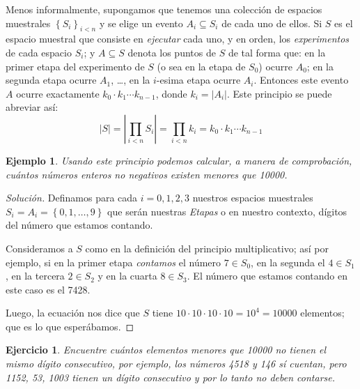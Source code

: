 \documentclass[spanish]{report}
\newtheorem{ejm}[thm]{Ejemplo}
\newtheorem{ejer}[thm]{Ejercicio}
\newcommand{\card}[1]{\left|#1 \right|}
\begin{document}
Menos informalmente, supongamos que tenemos una colección de espacios muestrales $\left\lbrace S_i \right\rbrace_{i<n}$ y se elige un evento $A_i \subseteq S_i$ de cada uno de ellos. 
Si $S$ es el espacio muestral que consiste en \emph{ejecutar} %
cada uno, y en orden, los \emph{experimentos} de cada espacio $S_i$; y $A \subseteq S$ denota los puntos de $S$ de tal forma que: en la primer etapa del experimento de $S$ (o sea en la etapa de $S_0$) ocurre $A_0$; en la segunda etapa ocurre $A_1$, \ldots, en la $i$-esima etapa ocurre $A_i$. Entonces este evento $A$ ocurre exactamente $k_0 \cdotp k_1 \cdots k_{n-1}$, donde $k_i= \card{A_i}$.
Este principio se puede abreviar así:
\begin{equation}\label{eq_PrincipioMultiplicativo}
	\card{S} = \card{\prod_{i<n} S_i} = \prod_{i<n}k_i = k_0 \cdotp k_1 \cdots k_{n-1}
\end{equation}

\begin{ejm}
	Usando este principio podemos calcular, a manera de comprobación, cuántos números enteros no negativos existen menores que 10000.
\end{ejm}
\begin{proof}[Solución]
Definamos para cada $i=0,1,2,3$ nuestros espacios muestrales $S_i = A_i= \left\lbrace 0,1, \ldots,9 \right\rbrace$ que serán nuestras \emph{Etapas} o en nuestro contexto, dígitos del número que estamos contando. %

Consideramos a $S$ como en la definición del principio multiplicativo; así por ejemplo, si en la primer etapa \emph{contamos} el número $7 \in S_0$, en la segunda el $4 \in S_1$, en la tercera $2 \in S_2$ y en la cuarta $8 \in S_3$. El número que estamos contando en este caso es el 7428.

Luego, la ecuación nos dice que $S$ tiene $10 \cdotp 10\cdotp 10 \cdotp 10 = 10^4 = 10000$ elementos; que es lo que esperábamos.
\end{proof}

\begin{ejer}
	Encuentre cuántos elementos menores que 10000 no tienen el mismo dígito consecutivo, por ejemplo, los números 4518 y 146 sí cuentan, pero 1152, 53, 1003 tienen un dígito consecutivo y por lo tanto no deben contarse.
\end{ejer}
\end{document}
